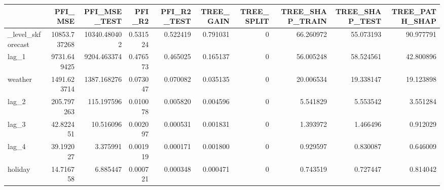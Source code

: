 \begin{tabular}{lrrrrrrrrr}
\toprule
 & PFI_MSE & PFI_MSE_TEST & PFI_R2 & PFI_R2_TEST & TREE_GAIN & TREE_SPLIT & TREE_SHAP_TRAIN & TREE_SHAP_TEST & TREE_PATH_SHAP \\
\midrule
_level_skforecast & 10853.737268 & 10340.480402 & 0.531524 & 0.522419 & 0.791031 & 0 & 66.260972 & 55.073193 & 90.977791 \\
lag_1 & 9731.649425 & 9204.463374 & 0.476573 & 0.465025 & 0.165137 & 0 & 56.005248 & 58.524561 & 42.800896 \\
weather & 1491.623714 & 1387.168276 & 0.073047 & 0.070082 & 0.035135 & 0 & 20.006534 & 19.338147 & 19.123898 \\
lag_2 & 205.797263 & 115.197596 & 0.010078 & 0.005820 & 0.004596 & 0 & 5.541829 & 5.553542 & 3.551284 \\
lag_3 & 42.822451 & 10.516096 & 0.002097 & 0.000531 & 0.001831 & 0 & 1.393972 & 1.466496 & 0.912029 \\
lag_4 & 39.192027 & 3.375991 & 0.001919 & 0.000171 & 0.001800 & 0 & 0.929597 & 0.830087 & 0.646009 \\
holiday & 14.716758 & 6.885447 & 0.000721 & 0.000348 & 0.000471 & 0 & 0.743519 & 0.727447 & 0.814042 \\
\bottomrule
\end{tabular}
